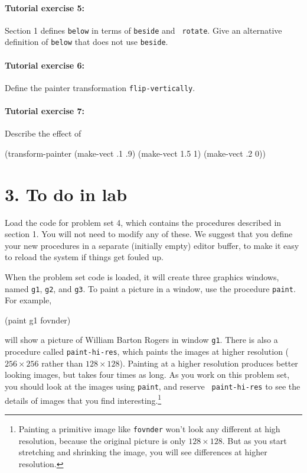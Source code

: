 \documentclass[11pt]{article}
\begin{document}
\paragraph{Tutorial exercise 5:}
Section 1 defines {\tt below} in terms of {\tt beside} and {\tt
rotate}.  Give an alternative definition of {\tt below} that does not
use {\tt beside}.

\paragraph{Tutorial exercise 6:}
Define the painter transformation {\tt flip-vertically}.

\paragraph{Tutorial exercise 7:}
Describe the effect of

\beginlisp
(transform-painter (make-vect .1 .9)
                   (make-vect 1.5 1)
                   (make-vect .2 0))
\endlisp

\section{3. To do in lab}

Load the code for problem set 4, which contains the procedures
described in section 1.  You will not need to modify any of these.  We
suggest that you define your new procedures in a separate (initially
empty) editor buffer, to make it easy to reload the system if things
get fouled up.

When the problem set code is loaded, it will create three graphics windows,
named {\tt g1}, {\tt g2}, and {\tt g3}.  To paint a picture in a
window, use the procedure {\tt paint}.  For example,

\beginlisp
(paint g1 fovnder)
\endlisp

\noindent
will show a picture of William Barton Rogers in window {\tt g1}.
There is also a procedure called {\tt paint-hi-res}, which paints the
images at higher resolution ($256 \times 256$ rather than $128 \times
128$).  Painting at a higher resolution produces better looking
images, but takes four times as long.  As you work on this problem
set, you should look at the images using {\tt paint}, and reserve {\tt
paint-hi-res} to see the details of images that you find
interesting.\footnote{Painting a primitive image like {\tt fovnder} won't
look any different at high resolution, because the original picture is
only $128 \times 128$.  But as you start stretching and shrinking the
image, you will see differences at higher resolution.}
\end{document}
